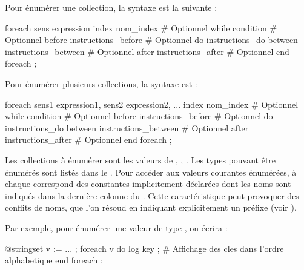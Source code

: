Pour énumérer une collection, la syntaxe est la suivante :

\begin{galgascode}
foreach sens expression
index nom_index # Optionnel
while condition # Optionnel
before instructions_before  # Optionnel
do instructions_do
between instructions_between  # Optionnel
after instructions_after  # Optionnel
end foreach ;
\end{galgascode}


Pour énumérer plusieurs collections, la syntaxe est :
\begin{galgascode}
foreach sens1 expression1, sens2 expression2, ...
index nom_index # Optionnel
while condition # Optionnel
before instructions_before  # Optionnel
do instructions_do
between instructions_between  # Optionnel
after instructions_after  # Optionnel
end foreach ;
\end{galgascode}

Les collections à énumérer sont les valeurs de , , . Les types pouvant être énumérés sont listés dans le . Pour accéder aux valeurs courantes énumérées, à chaque  correspond des constantes implicitement déclarées dont les noms sont indiqués dans la dernière colonne du . Cette caractéristique peut provoquer des conflits de noms, que l'on résoud en indiquant explicitement un préfixe (voir ).

Par exemple, pour énumérer une valeur de type , on écrira :
\begin{galgascode}
@stringset v := ... ;
foreach v do
  log key ; # Affichage des cles dans l'ordre alphabetique
end foreach ;
\end{galgascode}

